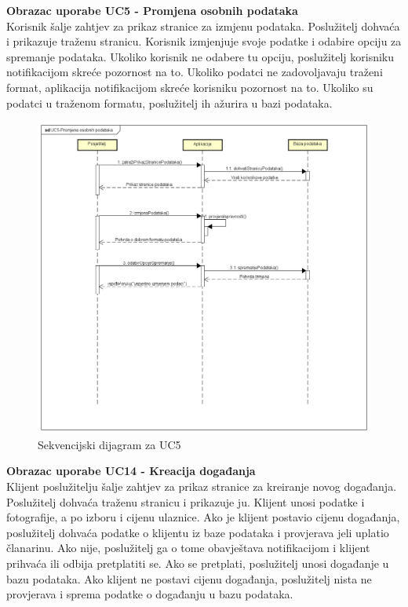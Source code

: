 				
				
				\textbf{\large Obrazac uporabe UC5 - Promjena osobnih podataka}\\


				Korisnik šalje zahtjev za prikaz stranice za izmjenu podataka. Poslužitelj dohvaća i prikazuje traženu stranicu. Korisnik izmjenjuje svoje podatke i odabire opciju za spremanje podataka. Ukoliko korisnik ne odabere tu opciju, poslužitelj korisniku notifikacijom skreće pozornost na to. Ukoliko podatci ne zadovoljavaju traženi format, aplikacija notifikacijom skreće korisniku pozornost na to. Ukoliko su podatci u traženom formatu, poslužitelj ih ažurira u bazi podataka.
				\begin{figure}[H]
						\includegraphics[width=\textwidth]{slike/uc5-1.PNG} 
						\caption{Sekvencijski dijagram za UC5}
						\label{fig:uc5}
				\end{figure}

				
				\eject
				
				
				
				\textbf{\large Obrazac uporabe UC14 - Kreacija događanja}\\
				
				Klijent poslužitelju šalje zahtjev za prikaz stranice za kreiranje novog događanja. Poslužitelj dohvaća traženu stranicu i prikazuje ju. Klijent unosi podatke i fotografije, a po izboru i cijenu ulaznice. Ako je klijent postavio cijenu događanja, poslužitelj dohvaća podatke o klijentu iz baze podataka i provjerava jeli uplatio članarinu. Ako nije, poslužitelj ga o tome obavještava notifikacijom i klijent prihvaća ili odbija pretplatiti se. Ako se pretplati, poslužitelj unosi događanje u bazu podataka. Ako klijent ne postavi cijenu događanja, poslužitelj nista ne provjerava i sprema podatke o događanju u bazu podataka.
				
